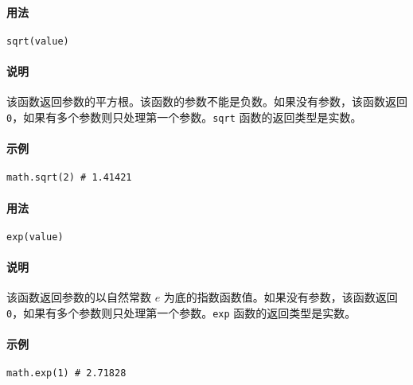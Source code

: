 
\paragraph{用法}
\begin{lstlisting}[language=berry, numbers=none]
sqrt(value)
\end{lstlisting}

\paragraph{说明}
该函数返回参数的平方根。该函数的参数不能是负数。如果没有参数，该函数返回 \texttt{0}，如果有多个参数则只处理第一个参数。\texttt{sqrt} 函数的返回类型是实数。

\paragraph{示例}
\begin{lstlisting}[language=berry, numbers=none]
math.sqrt(2) # 1.41421
\end{lstlisting}


\paragraph{用法}
\begin{lstlisting}[language=berry, numbers=none]
exp(value)
\end{lstlisting}

\paragraph{说明}
该函数返回参数的以自然常数 $e$ 为底的指数函数值。如果没有参数，该函数返回 \texttt{0}，如果有多个参数则只处理第一个参数。\texttt{exp} 函数的返回类型是实数。

\paragraph{示例}
\begin{lstlisting}[language=berry, numbers=none]
math.exp(1) # 2.71828
\end{lstlisting}


